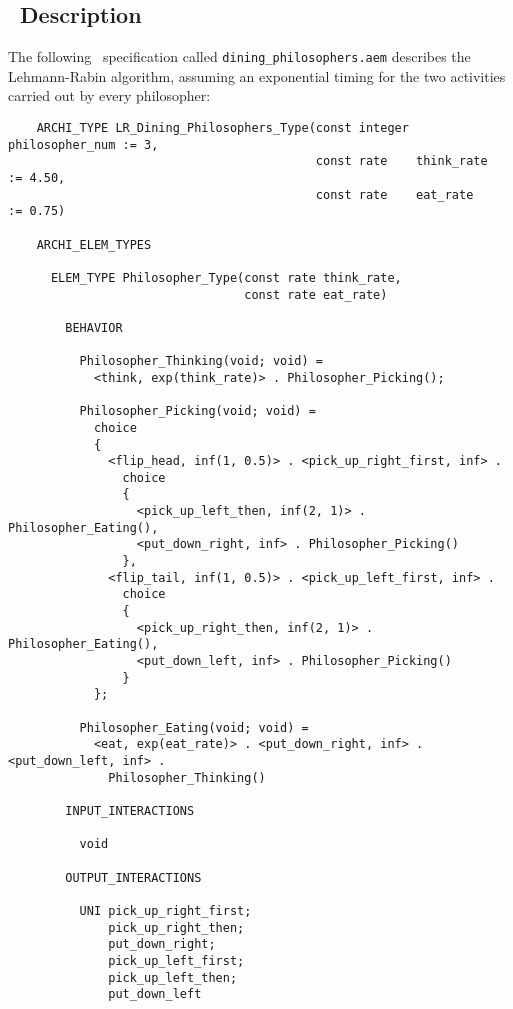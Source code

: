 \subsection{\aemilia\ Description}\label{dp}

The following \aemilia\ specification called {\tt dining\_philosophers.aem} describes the Lehmann-Rabin
algorithm, assuming an exponential timing for the two activities carried out by every philosopher:

	\begin{verbatim}
    ARCHI_TYPE LR_Dining_Philosophers_Type(const integer philosopher_num := 3,
                                           const rate    think_rate      := 4.50,
                                           const rate    eat_rate        := 0.75)

    ARCHI_ELEM_TYPES

      ELEM_TYPE Philosopher_Type(const rate think_rate,
                                 const rate eat_rate)

        BEHAVIOR

          Philosopher_Thinking(void; void) =
            <think, exp(think_rate)> . Philosopher_Picking();

          Philosopher_Picking(void; void) =
            choice
            {
              <flip_head, inf(1, 0.5)> . <pick_up_right_first, inf> .
                choice
                {
                  <pick_up_left_then, inf(2, 1)> . Philosopher_Eating(),
                  <put_down_right, inf> . Philosopher_Picking()
                },
              <flip_tail, inf(1, 0.5)> . <pick_up_left_first, inf> .
                choice
                {
                  <pick_up_right_then, inf(2, 1)> . Philosopher_Eating(),
                  <put_down_left, inf> . Philosopher_Picking()
                }
            };

          Philosopher_Eating(void; void) =
            <eat, exp(eat_rate)> . <put_down_right, inf> . <put_down_left, inf> .
              Philosopher_Thinking()

        INPUT_INTERACTIONS

          void

        OUTPUT_INTERACTIONS

          UNI pick_up_right_first;
              pick_up_right_then;
              put_down_right;
              pick_up_left_first;
              pick_up_left_then;
              put_down_left


\end{verbatim}
